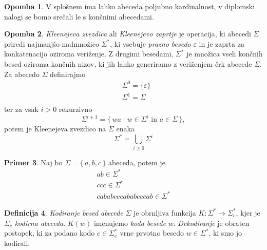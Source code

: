 \documentclass{amsart}
\theoremstyle{definition} %
\newtheorem{definicija}{Definicija}[section]
\newtheorem{primer}[definicija]{Primer}
\newtheorem{opomba}[definicija]{Opomba}
\theoremstyle{plain} %
\begin{document}
\begin{opomba}
    
    V splošnem ima lahko abeceda poljubno kardinalnost, v diplomski nalogi se bomo srečali le
    s končnimi abecedami.
    
\end{opomba}

\begin{opomba}
    
    \textit{Kleenejeva zvezdica} ali \textit{Kleenejevo zaprtje} je operacija, ki
    abecedi $ \Sigma $ priredi najmanjšo nadmnožico $ \Sigma^* $, ki vsebuje
    \textit{prazno besedo} $ \varepsilon $ in je zaprta za konkatenacijo oziroma veriženje.
    Z drugimi besedami, $ \Sigma^* $ je množica vseh končnih besed oziroma končnih nizov, ki
    jih lahko generiramo z veriženjem črk abecede $ \Sigma $.  \\
    Za abecedo $ \Sigma $ definirajmo
    \begin{align*}
        & \Sigma^0 = \{ \varepsilon \} \\
        & \Sigma^1 = \Sigma \\
    \end{align*}
    ter za vsak $ i > 0 $ rekurzivno
    \[
        \Sigma^{i+1} = \{\, wa \mid w \in \Sigma^i \text{ in } a \in \Sigma \,\},
    \]
    potem je Kleenejeva zvezdico na $ \Sigma $ enaka
    \[
        \Sigma^* = \bigcup_{i \geq 0} \Sigma^i
    \]

\end{opomba}

\begin{primer}
    
    Naj bo $ \Sigma = \{\, a,b,c \,\} $ abeceda, potem je
    \begin{gather*} 
        ab \in \Sigma^* \\
        ccc \in \Sigma^* \\
        cababcccababcccab \in \Sigma^*
    \end{gather*}

\end{primer}

\begin{definicija}
    
    \textit{Kodiranje besed abecede} $ \Sigma $ je obrnljiva funkcija $ K \colon \Sigma^* \to \Sigma_c^* $,
    kjer je $ \Sigma_c $ \textit{kodirna abeceda}. $ K(w) $ imenujemo \textit{koda besede} $ w $.
    \textit{Dekodiranje} je obraten postopek, ki za podano kodo $ c \in \Sigma_c^* $ vrne prvotno besedo
    $ w \in \Sigma^* $, ki smo jo kodirali.

\end{definicija}
\end{document}
